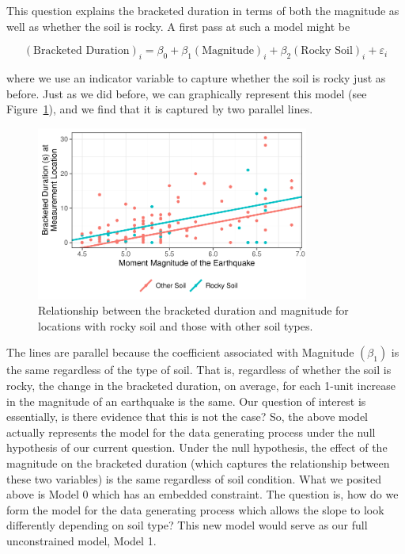 \documentclass[
  letterpaper,
  DIV=11,
  numbers=noendperiod]{scrreprt}
\theoremstyle{plain}
\theoremstyle{definition}
\theoremstyle{definition}
\theoremstyle{remark}
\begin{document}
This question explains the bracketed duration in terms of both the
magnitude as well as whether the soil is rocky. A first pass at such a
model might be

\[
(\text{Bracketed Duration})_i = \beta_0 + \beta_1(\text{Magnitude})_i + \beta_2(\text{Rocky Soil})_i + \varepsilon_i
\]

where we use an indicator variable to capture whether the soil is rocky
just as before. Just as we did before, we can graphically represent this
model (see Figure~\ref{fig-regextensions-ind-plot2}), and we find that
it is captured by two parallel lines.

\begin{figure}

{\centering \includegraphics[width=0.8\textwidth,height=\textheight]{./images/fig-regextensions-ind-plot2-1.pdf}

}

\caption{\label{fig-regextensions-ind-plot2}Relationship between the
bracketed duration and magnitude for locations with rocky soil and those
with other soil types.}

\end{figure}

The lines are parallel because the coefficient associated with Magnitude
\(\left(\beta_1\right)\) is the same regardless of the type of soil.
That is, regardless of whether the soil is rocky, the change in the
bracketed duration, on average, for each 1-unit increase in the
magnitude of an earthquake is the same. Our question of interest is
essentially, is there evidence that this is not the case? So, the above
model actually represents the model for the data generating process
under the null hypothesis of our current question. Under the null
hypothesis, the effect of the magnitude on the bracketed duration (which
captures the relationship between these two variables) is the same
regardless of soil condition. What we posited above is Model 0 which has
an embedded constraint. The question is, how do we form the model for
the data generating process which allows the slope to look differently
depending on soil type? This new model would serve as our full
unconstrained model, Model 1.
\end{document}
